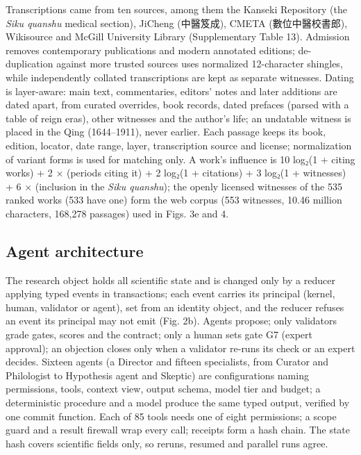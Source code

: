 \documentclass[
]{article}
\begin{document}
Transcriptions came from ten sources, among them the Kanseki Repository
(the \emph{Siku quanshu} medical section), JiCheng (中醫笈成), CMETA
(數位中醫校書郎), Wikisource and McGill University Library
(Supplementary Table 13). Admission removes contemporary publications
and modern annotated editions; de-duplication against more trusted
sources uses normalized 12-character shingles, while independently
collated transcriptions are kept as separate witnesses. Dating is
layer-aware: main text, commentaries, editors' notes and later additions
are dated apart, from curated overrides, book records, dated prefaces
(parsed with a table of reign eras), other witnesses and the author's
life; an undatable witness is placed in the Qing (1644--1911), never
earlier. Each passage keeps its book, edition, locator, date range,
layer, transcription source and license; normalization of variant forms
is used for matching only. A work's influence is 10 log₂(1 + citing
works) + 2 × (periods citing it) + 2 log₂(1 + citations) + 3 log₂(1 +
witnesses) + 6 × (inclusion in the \emph{Siku quanshu}); the openly
licensed witnesses of the 535 ranked works (533 have one) form the web
corpus (553 witnesses, 10.46 million characters, 168,278 passages) used
in Figs. 3e and 4.

\hypertarget{agent-architecture}{%
\subsection{Agent architecture}\label{agent-architecture}}

The research object holds all scientific state and is changed only by a
reducer applying typed events in transactions; each event carries its
principal (kernel, human, validator or agent), set from an identity
object, and the reducer refuses an event its principal may not emit
(Fig. 2b). Agents propose; only validators grade gates, scores and the
contract; only a human sets gate G7 (expert approval); an objection
closes only when a validator re-runs its check or an expert decides.
Sixteen agents (a Director and fifteen specialists, from Curator and
Philologist to Hypothesis agent and Skeptic) are configurations naming
permissions, tools, context view, output schema, model tier and budget;
a deterministic procedure and a model produce the same typed output,
verified by one commit function. Each of 85 tools needs one of eight
permissions; a scope guard and a result firewall wrap every call;
receipts form a hash chain. The state hash covers scientific fields
only, so reruns, resumed and parallel runs agree.
\end{document}
